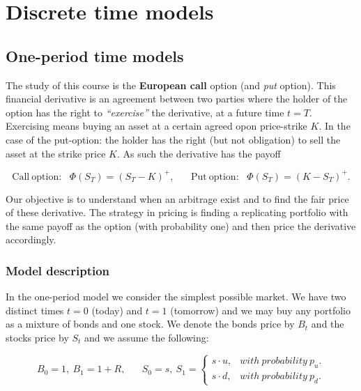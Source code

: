 \documentclass[a4paper,10pt,openany]{book}
\begin{document}
\hypertarget{discrete-time-models}{%
\section{Discrete time models}\label{discrete-time-models}}

\hypertarget{one-period-time-models}{%
\subsection{One-period time models}\label{one-period-time-models}}

The study of this course is the \textbf{European call} option (and \emph{put} option). This financial derivative is an agreement between two parties where the holder of the option has the right to \emph{``exercise''} the derivative, at a future time \(t=T\). Exercising means buying an asset at a certain agreed opon price-strike \(K\). In the case of the put-option: the holder has the right (but not obligation) to sell the asset at the strike price \(K\). As such the derivative has the payoff

\[
\text{Call}\ \text{option:}\hspace{10pt}\Phi(S_T)=(S_T-K)^+,\hspace{20pt}\text{Put}\ \text{option:}\hspace{10pt}\Phi(S_T)=(K-S_T)^+.
\]

Our objective is to understand when an arbitrage exist and to find the fair price of these derivative. The strategy in pricing is finding a replicating portfolio with the same payoff as the option (with probability one) and then price the derivative accordingly.

\hypertarget{model-description}{%
\subsubsection{Model description}\label{model-description}}

In the one-period model we consider the simplest possible market. We have two distinct times \(t=0\) (today) and \(t=1\) (tomorrow) and we may buy any portfolio as a mixture of bonds and one stock. We denote the bonds price by \(B_t\) and the stocks price by \(S_t\) and we assume the following:

\[
B_0=1,\ B_1=1+R,\hspace{20pt}S_0=s,\ S_1=\left\{\begin{matrix}s\cdot u, & with\ probability\ p_u.\\s\cdot d, & with\ probability\ p_d.\end{matrix}\right.
\]
\end{document}
